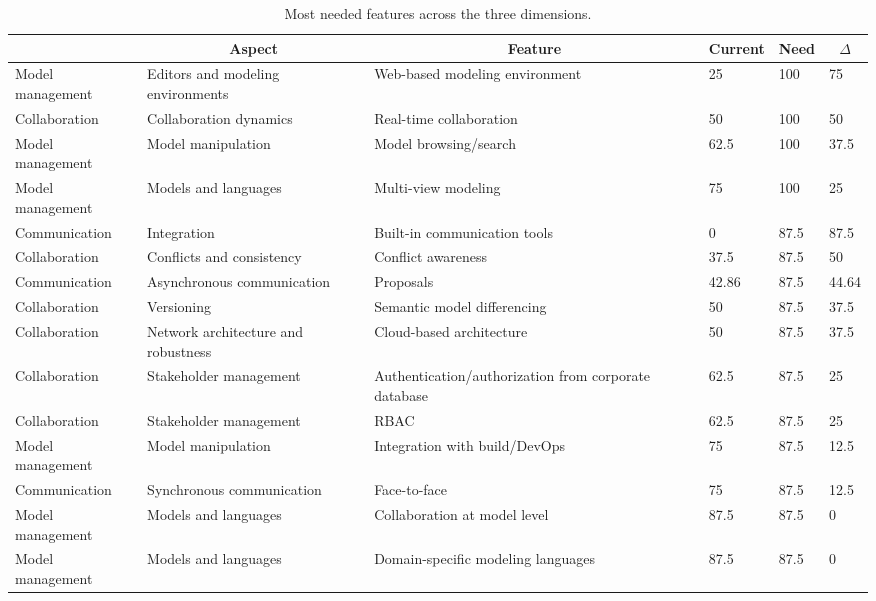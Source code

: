 
  \begin{table*}[]
  \centering
  \notsotiny
  \caption{ Most needed features across the three dimensions.}
\label{tab:most-needed}
\begin{tabular}{|l|l|l|l|l|l|}
  \hline
  \rowcolor[HTML]{C0C0C0}
    \multicolumn{1}{|c|}{Dimension} & \multicolumn{1}{c|}{Aspect} & \multicolumn{1}{c|}{Feature} & \multicolumn{1}{c|}{Current} & \multicolumn{1}{c|}{Need} & \multicolumn{1}{c|}{$\Delta$} \\ \hline
    Model management & Editors and modeling environments & Web-based modeling environment & 25 & 100 & 75 \\ \hline 
Collaboration & Collaboration dynamics & Real-time collaboration & 50 & 100 & 50 \\ \hline 
Model management & Model manipulation & Model browsing/search & 62.5 & 100 & 37.5 \\ \hline 
Model management & Models and languages & Multi-view modeling & 75 & 100 & 25 \\ \hline 
Communication & Integration & Built-in communication tools & 0 & 87.5 & 87.5 \\ \hline 
Collaboration & Conflicts and consistency & Conflict awareness & 37.5 & 87.5 & 50 \\ \hline 
Communication & Asynchronous communication & Proposals & 42.86 & 87.5 & 44.64 \\ \hline 
Collaboration & Versioning & Semantic model differencing & 50 & 87.5 & 37.5 \\ \hline 
Collaboration & Network architecture and robustness & Cloud-based architecture & 50 & 87.5 & 37.5 \\ \hline 
Collaboration & Stakeholder management & Authentication/authorization from corporate database & 62.5 & 87.5 & 25 \\ \hline 
Collaboration & Stakeholder management & RBAC & 62.5 & 87.5 & 25 \\ \hline 
Model management & Model manipulation & Integration with build/DevOps & 75 & 87.5 & 12.5 \\ \hline 
Communication & Synchronous communication & Face-to-face & 75 & 87.5 & 12.5 \\ \hline 
Model management & Models and languages & Collaboration at model level & 87.5 & 87.5 & 0 \\ \hline 
Model management & Models and languages & Domain-specific modeling languages & 87.5 & 87.5 & 0 \\ \hline 

\end{tabular}
\end{table*}
